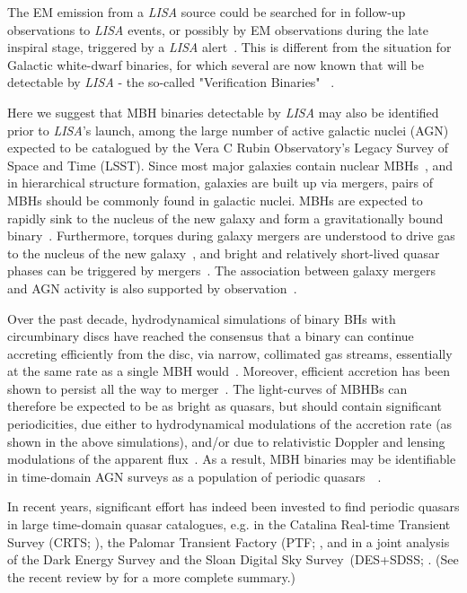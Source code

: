\documentclass[fleqn,usenatbib]{mnras}
\begin{document}
The EM emission from a {\it LISA} source could be searched for in follow-up observations to {\it LISA} events, or possibly by EM observations during the late inspiral stage, triggered by a {\it LISA} alert~\citep{Kocsis+2008}.
This is different from the situation for Galactic white-dwarf binaries, for which several are now known that will be detectable by {\it LISA} - the so-called "Verification Binaries" ~\citep[see][and references therein]{Burdge+2020}.

Here we suggest that MBH binaries detectable by {\it LISA} may also be identified prior to {\it LISA}'s launch, among the large number of active galactic nuclei (AGN) expected to be catalogued by the Vera C Rubin Observatory's Legacy Survey of Space and Time (LSST).   Since most major galaxies contain nuclear MBHs~\citep{KormendyHo2013}, and in hierarchical structure formation, galaxies are built up via mergers, pairs of MBHs  should be commonly found in galactic nuclei.  MBHs are expected to rapidly sink to the nucleus of the new galaxy and form a gravitationally bound binary~\citep{Begelman+1980}.   Furthermore, torques  during galaxy mergers are understood to drive gas to the nucleus of the new galaxy~\citep{BarnesHernquist1991}, and
bright and relatively short-lived quasar phases can be triggered by mergers~\citep{KauffmannHaehnelt2000,AlexanderHickox2012}. The association between galaxy mergers and AGN activity is also supported by observation~\citep{Goulding+2018}.    

Over the past decade,  hydrodynamical simulations of binary BHs with circumbinary discs have reached the consensus that a binary can continue accreting efficiently from the disc, via narrow, collimated gas streams, essentially at the same rate as a single MBH would~\citep{Dorazio+2013,Farris+2014,ShiKrolik2015,Miranda+2017}.  Moreover, efficient accretion has been shown to persist all the way to merger~\citep{Farris+2015,Tang+2018,Bowen18,Bowen19}.  The light-curves of MBHBs can therefore be expected to be as bright as quasars, but should contain significant periodicities, due either to hydrodynamical modulations of the accretion rate (as shown in the above simulations), and/or due to relativistic Doppler and lensing modulations of the apparent flux~\citep{Bogdanovic+2011,Dorazio+2015,Haiman2017,DorazioDiStefano2018}.  As a result, MBH binaries may be identifiable in time-domain AGN surveys as a population of periodic quasars~~\citep{Haiman2009a}.

In recent years, significant effort has indeed been invested to find periodic quasars in large time-domain quasar catalogues, e.g. in the Catalina Real-time Transient Survey (CRTS; \citealt{Graham+2015}), the Palomar Transient Factory (PTF; \citealt{Charisi+2016}, and in a joint analysis of the Dark Energy Survey and the Sloan Digital Sky Survey~(DES+SDSS; \citealt{Chen+2020}.  (See the recent review by \citealt{DeRosa+2019} for a more complete summary.)
\end{document}
